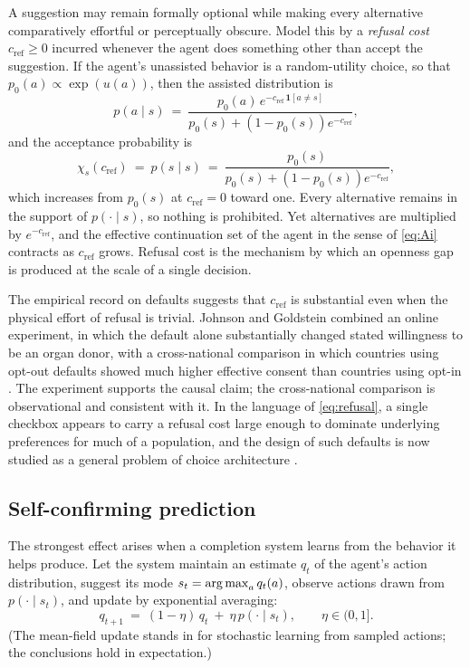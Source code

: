 A suggestion may remain formally optional while making every alternative comparatively effortful or perceptually obscure. Model this by a \emph{refusal cost} $c_{\mathrm{ref}}\geq 0$ incurred whenever the agent does something other than accept the suggestion. If the agent's unassisted behavior is a random-utility choice, so that $p_0(a)\propto\exp(u(a))$, then the assisted distribution is
\begin{equation}\label{eq:refusal}
p(a\mid s)\ =\ \frac{p_0(a)\,e^{-c_{\mathrm{ref}}\,\mathbf{1}[a\neq s]}}{p_0(s)+(1-p_0(s))e^{-c_{\mathrm{ref}}}},
\end{equation}
and the acceptance probability is
\begin{equation}
\chi_s(c_{\mathrm{ref}})\ =\ p(s\mid s)\ =\ \frac{p_0(s)}{p_0(s)+(1-p_0(s))e^{-c_{\mathrm{ref}}}},
\end{equation}
which increases from $p_0(s)$ at $c_{\mathrm{ref}}=0$ toward one. Every alternative remains in the support of $p(\cdot\mid s)$, so nothing is prohibited. Yet alternatives are multiplied by $e^{-c_{\mathrm{ref}}}$, and the effective continuation set of the agent in the sense of \eqref{eq:Ai} contracts as $c_{\mathrm{ref}}$ grows. Refusal cost is the mechanism by which an openness gap is produced at the scale of a single decision.

The empirical record on defaults suggests that $c_{\mathrm{ref}}$ is substantial even when the physical effort of refusal is trivial. Johnson and Goldstein combined an online experiment, in which the default alone substantially changed stated willingness to be an organ donor, with a cross-national comparison in which countries using opt-out defaults showed much higher effective consent than countries using opt-in \cite{johnsongoldstein2003}. The experiment supports the causal claim; the cross-national comparison is observational and consistent with it. In the language of \eqref{eq:refusal}, a single checkbox appears to carry a refusal cost large enough to dominate underlying preferences for much of a population, and the design of such defaults is now studied as a general problem of choice architecture \cite{johnson2012}.

\subsection{Self-confirming prediction}

The strongest effect arises when a completion system learns from the behavior it helps produce. Let the system maintain an estimate $q_t$ of the agent's action distribution, suggest its mode $s_t=\operatorname*{arg\,max}_aq_t(a)$, observe actions drawn from $p(\cdot\mid s_t)$, and update by exponential averaging:
\begin{equation}\label{eq:learning}
q_{t+1}\ =\ (1-\eta)\,q_t\ +\ \eta\,p(\cdot\mid s_t),\qquad\eta\in(0,1].
\end{equation}
(The mean-field update stands in for stochastic learning from sampled actions; the conclusions hold in expectation.)

